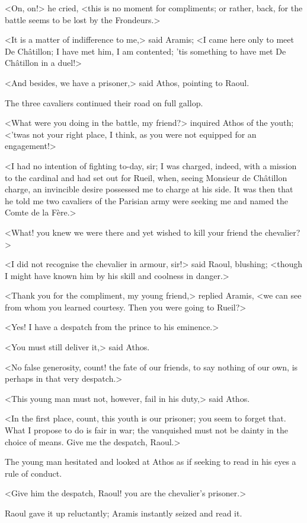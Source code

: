 <On, on!> he cried, <this is no moment for compliments; or rather, back, for the battle seems to be lost by the Frondeurs.>

<It is a matter of indifference to me,> said Aramis; <I came here only to meet De Châtillon; I have met him, I am contented; 'tis something to have met De Châtillon in a duel!>

<And besides, we have a prisoner,> said Athos, pointing to Raoul.

The three cavaliers continued their road on full gallop.

<What were you doing in the battle, my friend?> inquired Athos of the youth; <'twas not your right place, I think, as you were not equipped for an engagement!>

<I had no intention of fighting to-day, sir; I was charged, indeed, with a mission to the cardinal and had set out for Rueil, when, seeing Monsieur de Châtillon charge, an invincible desire possessed me to charge at his side. It was then that he told me two cavaliers of the Parisian army were seeking me and named the Comte de la Fère.>

<What! you knew we were there and yet wished to kill your friend the chevalier?>

<I did not recognise the chevalier in armour, sir!> said Raoul, blushing; <though I might have known him by his skill and coolness in danger.>

<Thank you for the compliment, my young friend,> replied Aramis, <we can see from whom you learned courtesy. Then you were going to Rueil?>

<Yes! I have a despatch from the prince to his eminence.>

<You must still deliver it,> said Athos.

<No false generosity, count! the fate of our friends, to say nothing of our own, is perhaps in that very despatch.>

<This young man must not, however, fail in his duty,> said Athos.

<In the first place, count, this youth is our prisoner; you seem to forget that. What I propose to do is fair in war; the vanquished must not be dainty in the choice of means. Give me the despatch, Raoul.>

The young man hesitated and looked at Athos as if seeking to read in his eyes a rule of conduct.

<Give him the despatch, Raoul! you are the chevalier's prisoner.>

Raoul gave it up reluctantly; Aramis instantly seized and read it.

